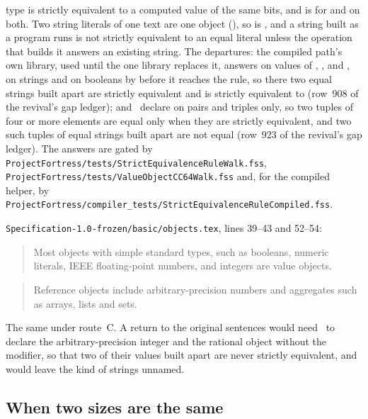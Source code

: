 \begin{description}
type  is strictly equivalent to a computed 
value of the same bits, and  is  for  and
 on both.
Two string literals of one text are one object (),
so  is , and
a string built as a program runs is not strictly equivalent to an equal literal
unless the operation that builds it answers an existing string.
The departures:
the compiled path's own library, used until the one library replaces it,
answers \EXP{\sequiv} on values of , ,
 and , on strings and on booleans by
\EXP{=} before it
reaches the rule, so there two equal strings built apart are strictly
equivalent and  is strictly equivalent to  (row~908 of the
revival's gap ledger);
and \library\ declare \EXP{=} on pairs and triples only, so two tuples of four
or more elements are equal only when they are strictly equivalent, and two such
tuples of equal strings built apart are not equal (row~923 of the revival's
gap ledger).
The answers are gated by \nolinkurl{ProjectFortress/tests/StrictEquivalenceRuleWalk.fss},
\nolinkurl{ProjectFortress/tests/ValueObjectCC64Walk.fss} and, for the compiled
helper, by \nolinkurl{ProjectFortress/compiler_tests/StrictEquivalenceRuleCompiled.fss}.
\item[Original text] \nolinkurl{Specification-1.0-frozen/basic/objects.tex},
lines 39--43 and 52--54:
\begin{quote}
Most objects with simple standard types,
such as booleans,
numeric literals,
IEEE floating-point numbers,
and integers are value objects.
\end{quote}
\begin{quote}
Reference objects include
arbitrary-precision numbers
and aggregates such as arrays, lists and sets.
\end{quote}
\item[Route C] The same under route~C.
A return to the original sentences would need \library\ to declare the
arbitrary-precision integer and the rational object without the 
modifier, so that two of their values built apart are never strictly
equivalent, and would leave the kind of strings unnamed.
\end{description}

\subsection{When two sizes are the same}

